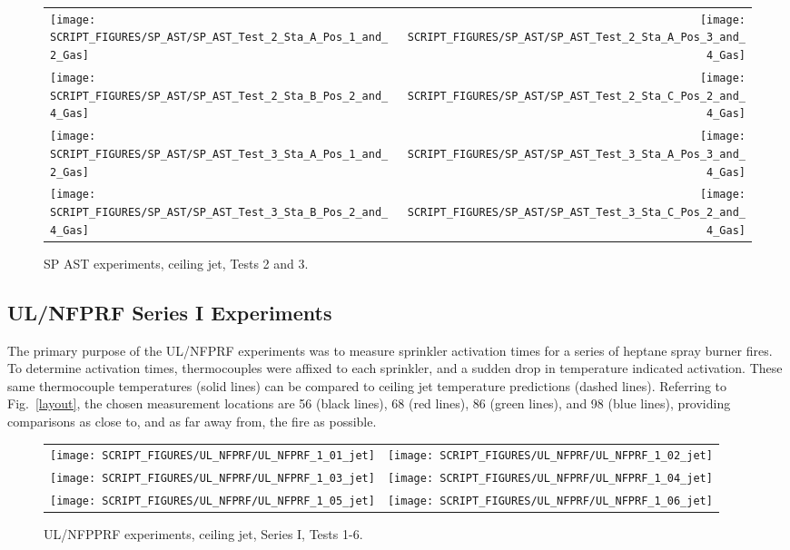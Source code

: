 \begin{figure}[p]
\begin{tabular*}{\textwidth}{l@{\extracolsep{\fill}}r}
\texttt{[image: SCRIPT\_FIGURES/SP\_AST/SP\_AST\_Test\_2\_Sta\_A\_Pos\_1\_and\_2\_Gas]} &
\texttt{[image: SCRIPT\_FIGURES/SP\_AST/SP\_AST\_Test\_2\_Sta\_A\_Pos\_3\_and\_4\_Gas]} \\
\texttt{[image: SCRIPT\_FIGURES/SP\_AST/SP\_AST\_Test\_2\_Sta\_B\_Pos\_2\_and\_4\_Gas]} &
\texttt{[image: SCRIPT\_FIGURES/SP\_AST/SP\_AST\_Test\_2\_Sta\_C\_Pos\_2\_and\_4\_Gas]} \\
\texttt{[image: SCRIPT\_FIGURES/SP\_AST/SP\_AST\_Test\_3\_Sta\_A\_Pos\_1\_and\_2\_Gas]} &
\texttt{[image: SCRIPT\_FIGURES/SP\_AST/SP\_AST\_Test\_3\_Sta\_A\_Pos\_3\_and\_4\_Gas]} \\
\texttt{[image: SCRIPT\_FIGURES/SP\_AST/SP\_AST\_Test\_3\_Sta\_B\_Pos\_2\_and\_4\_Gas]} &
\texttt{[image: SCRIPT\_FIGURES/SP\_AST/SP\_AST\_Test\_3\_Sta\_C\_Pos\_2\_and\_4\_Gas]}
\end{tabular*}
\caption[SP AST experiments, ceiling jet, Tests 2 and 3]{SP AST experiments, ceiling jet, Tests 2 and 3.}
\label{SP_Test_2_3_Gas}
\end{figure}


\clearpage

\subsection{UL/NFPRF Series I Experiments}

The primary purpose of the UL/NFPRF experiments was to measure sprinkler activation times for a series of heptane spray burner fires. To determine activation times, thermocouples were affixed to each sprinkler, and a sudden drop in temperature indicated activation. These same thermocouple temperatures (solid lines) can be compared to ceiling jet temperature predictions (dashed lines). Referring to Fig.~\ref{layout}, the chosen measurement locations are 56 (black lines), 68 (red lines), 86 (green lines), and 98 (blue lines), providing comparisons as close to, and as far away from, the fire as possible.


\begin{figure}[h!]
\begin{tabular*}{\textwidth}{l@{\extracolsep{\fill}}r}
\texttt{[image: SCRIPT\_FIGURES/UL\_NFPRF/UL\_NFPRF\_1\_01\_jet]} &
\texttt{[image: SCRIPT\_FIGURES/UL\_NFPRF/UL\_NFPRF\_1\_02\_jet]} \\
\texttt{[image: SCRIPT\_FIGURES/UL\_NFPRF/UL\_NFPRF\_1\_03\_jet]} &
\texttt{[image: SCRIPT\_FIGURES/UL\_NFPRF/UL\_NFPRF\_1\_04\_jet]} \\
\texttt{[image: SCRIPT\_FIGURES/UL\_NFPRF/UL\_NFPRF\_1\_05\_jet]} &
\texttt{[image: SCRIPT\_FIGURES/UL\_NFPRF/UL\_NFPRF\_1\_06\_jet]}
\end{tabular*}
\caption[UL/NFPPRF experiments, ceiling jet, Series I, Tests 1-6]{UL/NFPPRF experiments, ceiling jet, Series I, Tests 1-6.}
\label{UL_NFPRF_jet_1}
\end{figure}

